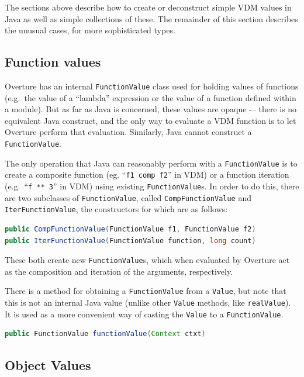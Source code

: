 \documentclass{overturerepchap}
\begin{document}
The sections above describe how to create or deconstruct simple VDM values in Java as well as simple collections of these. The remainder of this section describes the unusual cases, for more sophisticated types.

\subsection{Function values}

Overture has an internal \texttt{FunctionValue} class used for holding values of functions (e.g.\ the value of a ``{\textbf\ttfamily lambda}'' expression or the value of a function defined within a module). But as far as Java is concerned, these values are opaque -– there is no equivalent Java construct, and the only way to evaluate a VDM function is to let Overture perform that evaluation. Similarly, Java cannot construct a \texttt{FunctionValue}.

The only operation that Java can reasonably perform with a \texttt{FunctionValue} is to create a composite function (eg. ``\texttt{f1 comp f2}'' in VDM) or a function iteration (e.g.\ ``\texttt{f ** 3}'' in VDM) using existing \texttt{FunctionValue}s. In order to do this, there are two subclasses of \texttt{FunctionValue}, called \texttt{CompFunctionValue} and \texttt{IterFunctionValue}, the constructors for which are as follows:

\begin{lstlisting}[language=JAVA]
public CompFunctionValue(FunctionValue f1, FunctionValue f2)
public IterFunctionValue(FunctionValue function, long count)
\end{lstlisting}

These both create new \texttt{FunctionValue}s, which when evaluated by Overture act as the composition and iteration of the arguments, respectively.

There is a method for obtaining a \texttt{FunctionValue} from a \texttt{Value}, but note that this is not an internal Java value (unlike other \texttt{Value} methods, like \texttt{realValue}). It is used as a more convenient way of casting the \texttt{Value} to a \texttt{FunctionValue}.

\begin{lstlisting}[language=JAVA]
public FunctionValue functionValue(Context ctxt)
\end{lstlisting}

\subsection{Object Values}
\end{document}
